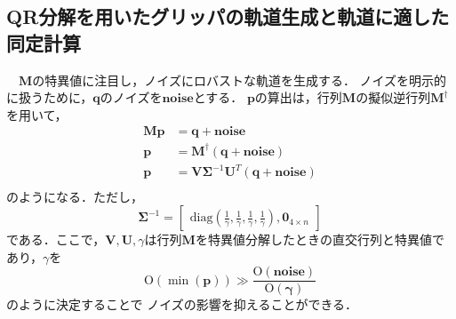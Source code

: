 \documentclass[a4paper]{jarticle}
\begin{document}
\subsection{QR分解を用いたグリッパの軌道生成と軌道に適した同定計算}\label{subsec:QR_traj_and_calculation}
　$\mathbf{M}$の特異値に注目し，ノイズにロバストな軌道を生成する．%
ノイズを明示的に扱うために，$\mathbf{q}$のノイズを$\mathbf{noise}$とする．
$\mathbf{p}$の算出は，行列$\mathbf{M}$の擬似逆行列$\mathbf{M}^{\dagger}$を用いて，
\begin{equation}
    \begin{aligned}
    \mathbf{M}\mathbf{p} &= \mathbf{q} + \mathbf{noise}\\
              \mathbf{p} &= \mathbf{M}^{\dagger}(\mathbf{q} + \mathbf{noise})\\ 
            \mathbf{p} &= \mathbf{V}\mathbf{\Sigma}^{-1}\mathbf{U}^T(\mathbf{q}+\mathbf{noise})\\
    \end{aligned}
\end{equation}
のようになる．ただし，
\begin{equation}
            \mathbf{\Sigma}^{-1} =
            \begin{bmatrix}
                 \mathrm{diag}(\frac{1}{\gamma}, \frac{1}{\gamma}, \frac{1}{\gamma}, \frac{1}{\gamma}), \mathbf{0}_{4 \times n}
            \end{bmatrix}
\end{equation}
である．ここで，$\mathbf{V},\mathbf{U},\gamma$は行列$\mathbf{M}$を特異値分解したときの直交行列と特異値であり，$\gamma$を
\begin{equation}
    \mathrm{O}(\min({\mathbf{p}})) \gg \frac{\mathrm{O}(\mathbf{noise})}{\mathrm{O}(\mathbf{\gamma})}
    \label{eq:gamma}
\end{equation}
のように決定することで
ノイズの影響を抑えることができる．
\end{document}
